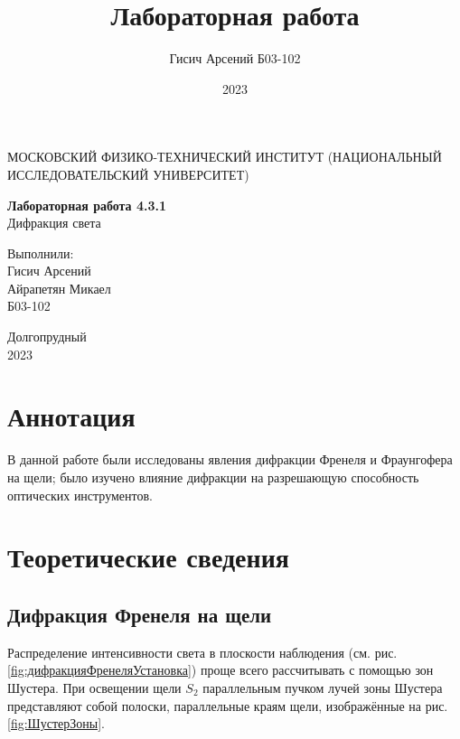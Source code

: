 \documentclass[a4paper, 12pt]{article}
\title{Лабораторная работа}
\author{Гисич Арсений Б03-102}
\date{2023}
\begin{document}
	\begin{center}
		{\large МОСКОВСКИЙ ФИЗИКО-ТЕХНИЧЕСКИЙ ИНСТИТУТ (НАЦИОНАЛЬНЫЙ ИССЛЕДОВАТЕЛЬСКИЙ УНИВЕРСИТЕТ)}
	\end{center}
	\vspace{5 cm}
	{\Large
		\begin{center}
			{\bf Лабораторная работа 4.3.1}\\[0.2 cm]
			Дифракция света
		\end{center}
	}
	\vspace{4 cm}
	\begin{flushright}
		{\Large Выполнили: \\
			\vspace{0.2 cm}
			Гисич Арсений \\
            Айрапетян Микаел \\
			\vspace{0.2 cm}
			Б03-102 \\}
	\end{flushright}
	\vspace{8 cm}
	\begin{center}
		Долгопрудный\\[0.1 cm]
		2023
	\end{center}
\thispagestyle{empty}

\section{Аннотация}

В данной работе были исследованы явления дифракции Френеля и Фраунгофера на щели; было изучено влияние дифракции на разрешающую способность оптических инструментов.

\section{Теоретические сведения}

\subsection{Дифракция Френеля на щели}

Распределение интенсивности света в плоскости наблюдения (см. рис. \ref{fig:дифракцияФренеляУстановка}) проще всего рассчитывать с помощью зон Шустера. При освещении щели $ S_2 $ параллельным пучком лучей зоны Шустера представляют собой полоски, параллельные краям щели, изображённые на рис. \ref{fig:ШустерЗоны}. 
\end{document}
